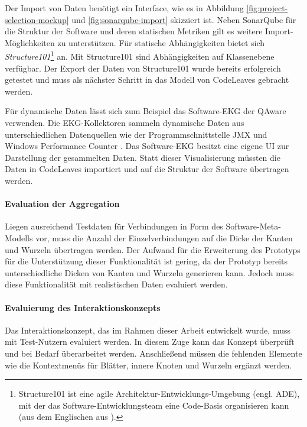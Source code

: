 Der Import von Daten benötigt ein Interface, wie es in Abbildung \ref{fig:project-selection-mockup} und \ref{fig:sonarqube-import} skizziert ist. Neben SonarQube für die Struktur der Software und deren statischen Metriken gilt es weitere Import-Möglichkeiten zu unterstützen. Für statische Abhängigkeiten bietet sich \textit{Structure101}\footnote{Structure101 ist eine agile Architektur-Entwicklungs-Umgebung (engl. ADE), mit der das Software-Entwicklungsteam eine Code-Basis organisieren kann (aus dem Englischen aus \cite{headway2017structure101}).} an. Mit Structure101 sind Abhängigkeiten auf Klassenebene verfügbar. Der Export der Daten von Structure101 wurde bereits erfolgreich getestet und muss als nächster Schritt in das Modell von CodeLeaves gebracht werden.

Für dynamische Daten lässt sich zum Beispiel das Software-EKG der QAware verwenden. Die EKG-Kollektoren sammeln dynamische Daten aus unterschiedlichen Datenquellen wie der Programmschnittstelle JMX und Windows Performance Counter \cite{weigend2011dynamische}. Das Software-EKG besitzt eine eigene UI zur Darstellung der gesammelten Daten. Statt dieser Visualisierung müssten die Daten in CodeLeaves importiert und auf die Struktur der Software übertragen werden.

\paragraph{Evaluation der Aggregation}

Liegen ausreichend Testdaten für Verbindungen in Form des Software-Meta-Modells vor, muss die Anzahl der Einzelverbindungen auf die Dicke der Kanten und Wurzeln übertragen werden. Der Aufwand für die Erweiterung des Prototyps für die Unterstützung dieser Funktionalität ist gering, da der Prototyp bereits unterschiedliche Dicken von Kanten und Wurzeln generieren kann. Jedoch muss diese Funktionalität mit realistischen Daten evaluiert werden.

\paragraph{Evaluierung des Interaktionskonzepts}

Das Interaktionskonzept, das im Rahmen dieser Arbeit entwickelt wurde, muss mit Test-Nutzern evaluiert werden. In diesem Zuge kann das Konzept überprüft und bei Bedarf überarbeitet werden. Anschließend müssen die fehlenden Elemente wie die Kontextmenüs für Blätter, innere Knoten und Wurzeln ergänzt werden.\\

